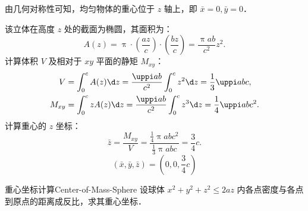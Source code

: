 \begin{solution}
    由几何对称性可知，均匀物体的重心位于 $z$ 轴上，即 $\bar{x} = 0, \bar{y} = 0$．

    该立体在高度 $z$ 处的截面为椭圆，其面积为：
    \begin{equation}\label{eq:area-z}
        A(z) = \uppi \cdot \left( \frac{a z}{c} \right) \cdot \left( \frac{b z}{c} \right) = \frac{\uppi ab}{c^2} z^2.
    \end{equation}
    计算体积 $V$ 及相对于 $xy$ 平面的静矩 $M_{xy}$：
    \begin{equation}\label{eq:v-and-m}
        \begin{aligned}
            V      & = \int_0^c A(z) \d z = \frac{\uppi ab}{c^2} \int_0^c z^2 \d z = \frac{1}{3} \uppi abc,     \\
            M_{xy} & = \int_0^c z A(z) \d z = \frac{\uppi ab}{c^2} \int_0^c z^3 \d z = \frac{1}{4} \uppi abc^2.
        \end{aligned}
    \end{equation}
    计算重心的 $z$ 坐标：
    \begin{equation}\label{eq:z-bar}
        \bar{z} = \frac{M_{xy}}{V} = \frac{\frac{1}{4} \uppi abc^2}{\frac{1}{3} \uppi abc} = \frac{3}{4} c.
    \end{equation}
    \begin{equation}
        \boxed{(\bar{x}, \bar{y}, \bar{z}) = \left( 0, 0, \frac{3}{4} c \right)}
    \end{equation}
\end{solution}

\begin{problem}{重心坐标计算}{Center-of-Mass-Sphere}
    设球体 $x^2 + y^2 + z^2 \le 2az$ 内各点密度与各点到原点的距离成反比，求其重心坐标．
\end{problem}

